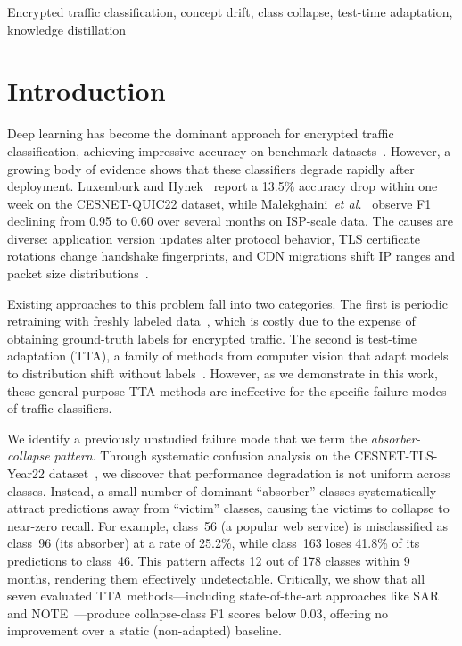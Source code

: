 \documentclass[journal]{IEEEtran}
\newcommand{\etal}{\textit{et al.}}
\begin{document}
\begin{IEEEkeywords}
Encrypted traffic classification, concept drift, class collapse, test-time adaptation, knowledge distillation
\end{IEEEkeywords}

\section{Introduction}
\label{sec:intro}

Deep learning has become the dominant approach for encrypted traffic classification, achieving impressive accuracy on benchmark datasets~\cite{luxemburk2023quic, lin2022etbert, zhao2023yatc}.
However, a growing body of evidence shows that these classifiers degrade rapidly after deployment.
Luxemburk and Hynek~\cite{luxemburk2023quic} report a 13.5\% accuracy drop within one week on the CESNET-QUIC22 dataset, while Malekghaini~\etal{}~\cite{malekghaini2023drift} observe F1 declining from 0.95 to 0.60 over several months on ISP-scale data.
The causes are diverse: application version updates alter protocol behavior, TLS certificate rotations change handshake fingerprints, and CDN migrations shift IP ranges and packet size distributions~\cite{soukup2025drift}.

Existing approaches to this problem fall into two categories.
The first is periodic retraining with freshly labeled data~\cite{chen2025selfevolving}, which is costly due to the expense of obtaining ground-truth labels for encrypted traffic.
The second is test-time adaptation (TTA), a family of methods from computer vision that adapt models to distribution shift without labels~\cite{wang2021tent, niu2022eata, niu2023sar}.
However, as we demonstrate in this work, these general-purpose TTA methods are ineffective for the specific failure modes of traffic classifiers.

We identify a previously unstudied failure mode that we term the \textit{absorber-collapse pattern}.
Through systematic confusion analysis on the CESNET-TLS-Year22 dataset~\cite{hynek2024cesnet}, we discover that performance degradation is not uniform across classes.
Instead, a small number of dominant ``absorber'' classes systematically attract predictions away from ``victim'' classes, causing the victims to collapse to near-zero recall.
For example, class~56 (a popular web service) is misclassified as class~96 (its absorber) at a rate of 25.2\%, while class~163 loses 41.8\% of its predictions to class~46.
This pattern affects 12 out of 178 classes within 9 months, rendering them effectively undetectable.
Critically, we show that all seven evaluated TTA methods---including state-of-the-art approaches like SAR~\cite{niu2023sar} and NOTE~\cite{gong2022note}---produce collapse-class F1 scores below 0.03, offering no improvement over a static (non-adapted) baseline.
\end{document}
